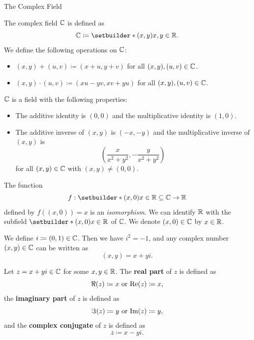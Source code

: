 \begin{section}{The Complex Field}

The complex field $\mathbb{C}$ is defined as
\[
\C \coloneqq \setbuilder*{(x, y)}{x, y \in \R}.
\]
We define the following operations on $\mathbb{C}$:
\begin{itemize}
    \item $(x, y) + (u, v) \coloneqq (x + u, y + v)$ for all $(x, y), (u, v) \in \mathbb{C}$.
    \item $(x, y) \cdot (u, v) \coloneqq (xu - yv, xv + yu)$ for all $(x, y), (u, v) \in \mathbb{C}$.
\end{itemize}

$\mathbb{C}$ is a field with the following properties:
\begin{itemize}
    \item The additive identity is $(0, 0)$ and the multiplicative identity is $(1, 0)$.
    \item The additive inverse of $(x, y)$ is $(-x, -y)$ and the multiplicative inverse of $(x, y)$ is
    \[
    \left(\dfrac{x}{x^{2} + y^{2}}, - \dfrac{y}{x^{2} + y^{2}}\right)
    \]
    for all $(x, y) \in \mathbb{C}$ with $(x, y) \neq (0, 0)$.
\end{itemize}

\bigskip

\begin{remark}
    The function
    \[
    f: \setbuilder*{(x, 0)}{x \in \R} \subseteq \C \to \R
    \]
    defined by $f((x, 0)) = x$ is an \emph{isomorphism}. We can identify $\mathbb{R}$ with the subfield
    $\setbuilder*{(x, 0)}{x \in \R}$ of $\mathbb{C}$. We denote $(x, 0) \in \mathbb{C}$ by $x \in \mathbb{R}$.
\end{remark}

\bigskip

\begin{remark}
We define $i \coloneqq (0, 1) \in \mathbb{C}$. Then we have $i^{2} = -1$, and any complex number $(x, y) \in \mathbb{C}$ can be written as
\[
(x, y) = x + yi.
\]
\end{remark}

\bigskip

\begin{definition} \label{def:RealPartImaginaryPartComplexConjugate}
    Let $z = x + yi \in \mathbb{C}$ for some $x, y \in \mathbb{R}$. The \textbf{real part} of $z$ is defined as
    \[
    \Re(z) \coloneqq x \text{ or } \textnormal{Re}(z) \coloneqq x,
    \]
    the \textbf{imaginary part} of $z$ is defined as
    \[
    \Im(z) \coloneqq y \text{ or } \textnormal{Im}(z) \coloneqq y,
    \]
    and the \textbf{complex conjugate} of $z$ is defined as
    \[
    \overline{z} \coloneqq x - yi.
    \]
\end{definition}


\end{section}
